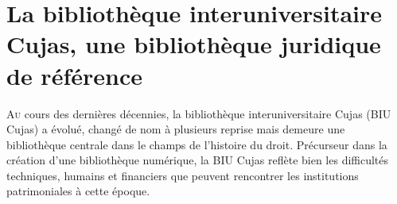 \chapter[BIU Cujas]{La bibliothèque interuniversitaire Cujas, une bibliothèque juridique de référence}

\lettrine{A}u cours des dernières décennies, la bibliothèque interuniversitaire Cujas (BIU Cujas) a évolué, changé de nom à plusieurs reprise mais demeure une bibliothèque centrale dans le champs de l'histoire du droit. Précurseur dans la création d'une bibliothèque numérique, la BIU Cujas reflète bien les difficultés techniques, humains et financiers que peuvent rencontrer les institutions patrimoniales à cette époque.





